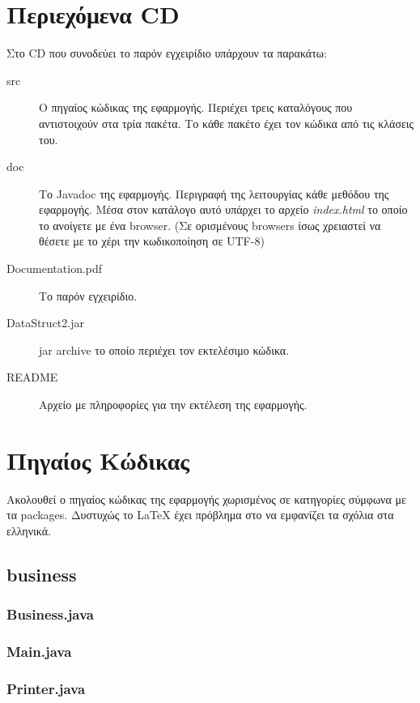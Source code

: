 \documentclass[a4paper]{article}
\begin{document}
\section{Περιεχόμενα CD}
Στο CD που συνοδεύει το παρόν εγχειρίδιο υπάρχουν τα παρακάτω:
\begin{description}
\item[src] Ο πηγαίος κώδικας της εφαρμογής. Περιέχει τρεις καταλόγους που
αντιστοιχούν στα τρία πακέτα. Το κάθε πακέτο έχει τον κώδικα από τις κλάσεις
του.
\item[doc] Το Javadoc της εφαρμογής. Περιγραφή της λειτουργίας κάθε μεθόδου της
εφαρμογής. Μέσα στον κατάλογο αυτό υπάρχει το αρχείο \emph{index.html} το οποίο
το ανοίγετε με ένα browser. (Σε ορισμένους browsers ίσως χρειαστεί να θέσετε με
το χέρι την κωδικοποίηση σε UTF-8)
\item[Documentation.pdf] Το παρόν εγχειρίδιο.
\item[DataStruct2.jar] jar archive το οποίο περιέχει τον εκτελέσιμο κώδικα.
\item[README] Αρχείο με πληροφορίες για την εκτέλεση της εφαρμογής.
\end{description}

\section{Πηγαίος Κώδικας}
Ακολουθεί ο πηγαίος κώδικας της εφαρμογής χωρισμένος σε κατηγορίες σύμφωνα με τα
packages. Δυστυχώς το \LaTeX{} έχει πρόβλημα στο να εμφανίζει τα σχόλια στα
ελληνικά.
\subsection{business}
\subsubsection{Business.java}
\lstset{language=Java, basicstyle=\footnotesize, frame=single, numbers=left}

\subsubsection{Main.java}
\lstset{language=Java, basicstyle=\footnotesize, frame=single, numbers=left}

\subsubsection{Printer.java}
\lstset{language=Java, basicstyle=\footnotesize, frame=single, numbers=left}

\end{document}
